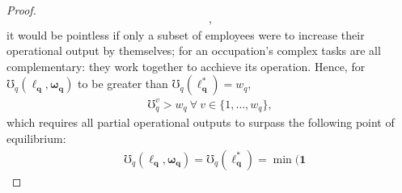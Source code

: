 \documentclass[hidelinks, nonatbib]{elsarticle}
\begin{document}
\begin{lemma}
\begin{proof}
\begin{gather}
            ,
        \end{gather}
        it would be pointless if only a subset of employees were to increase their operational output by themselves; for an occupation's complex tasks are all complementary: they work together to acchieve its operation. Hence, for $\mho_{q}(
            \boldsymbol{\ell_q}
            ,\boldsymbol{\omega_q}
        )$ to be greater than $
        \mho_{q}(
            \boldsymbol{\ell_{q}^{*}}
        )
        =
        w_q$,
        \begin{gather}
            \mho_{q}^{v} > w_q
            \
            \forall
            \
            v \in \{1, \dots, w_q\}
            ,
        \end{gather}
        which requires all partial operational outputs to surpass the following point of equilibrium:
        \begin{align}
            &\mho_{q}(
                \boldsymbol{\ell_q}
                ,\boldsymbol{\omega_q}
            ) 
            =
            \mho_{q}(
                \boldsymbol{\ell_{q}^{*}}
            ) 
            = 
            \min(
                \boldsymbol{1}

\end{align}
\end{proof}
\end{lemma}
\end{document}
